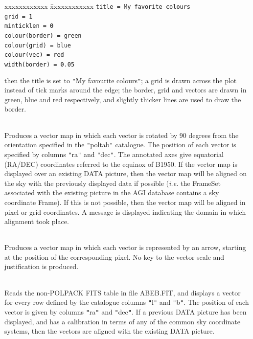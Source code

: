 \documentclass[twoside,11pt]{article}
\renewcommand{\_}{\texttt{\symbol{95}}}
\newlength{\sstexampleslength}
\newcommand{\sstexamplesubsection}[2]{\sloppy
\item[\parbox{\sstexampleslength}{\ssttt #1}] \mbox{} \vspace{1.0ex}
\\ #2 }
\newcommand{\sstnotes}[1]{\item[Notes:] \mbox{} \\[1.3ex] #1}
\newcommand{\sstitemlist}[1]{
  \mbox{} \\
  \vspace{-3.5ex}
  \begin{itemize}
     #1
  \end{itemize}
}
\newcommand{\sstexamplesubsection}[2]{\item[{\ssttt #1}] #2}
\newcommand{\sstnotes}[1]{\item[Notes:] #1 }
\newcommand{\sstitemlist}[1]{
      \begin{itemize}
         #1
      \end{itemize}
      \\
   }
\begin{document}
{{{\begin{tabbing}
 xxxxxxxxxxxx \= xxxxxxxxxxxx \kill
              \>  \texttt{title = My favorite colours} \\
              \>  \texttt{grid = 1} \\
              \>  \texttt{minticklen = 0} \\
              \>  \texttt{colour(border) = green} \\
              \>  \texttt{colour(grid) = blue} \\
              \>  \texttt{colour(vec) = red} \\
              \>  \texttt{width(border) = 0.05}
\end{tabbing}

         then the title is set to {\tt "}My favourite colours{\tt "}; a grid is drawn
         across the plot instead of tick marks around the edge; the border,
         grid and vectors are drawn in green, blue and red respectively,
         and slightly thicker lines are used to draw the border.
      }
      \sstexamplesubsection{
         polplot poltab ra dec noclear angrot=90 frame=eq(B1950)
      }{
         Produces a vector map in which each vector is rotated by 90
         degrees from the orientation specified in the {\tt "}poltab{\tt "}
         catalogue. The position of each vector is specified by columns
         {\tt "}ra{\tt "} and {\tt "}dec{\tt "}. The annotated axes give equatorial (RA/DEC)
         coordinates referred to the equinox of B1950. If the vector map
         is displayed over an existing DATA picture, then the vector map
         will be aligned on the sky with the previously displayed data if
         possible (\emph{i.e.} the FrameSet associated with the existing picture
         in the AGI database contains a sky coordinate Frame). If this is
         not possible, then the vector map will be aligned in pixel or
         grid coordinates. A message is displayed indicating the domain
         in which alignment took place.
      }
      \sstexamplesubsection{
         polplot poltab arrow=0.01 just=start nokey
      }{
         Produces a vector map in which each vector is represented by an
         arrow, starting at the position of the corresponding pixel.  No key
         to the vector scale and justification is produced.
      }
      \sstexamplesubsection{
         polplot ABEB.FIT clear=no colx=ra coly=dec colmag=l colang=b
      }{
         Reads the non-POLPACK FITS table in file ABEB.FIT, and displays a
         vector for every row defined by the catalogue columns {\tt "}l{\tt "} and {\tt "}b{\tt "}.
         The position of each vector is given by columns {\tt "}ra{\tt "} and {\tt "}dec{\tt "}.
         If a previous DATA picture has been displayed, and has a calibration
         in terms of any of the common sky coordinate systems, then the
         vectors are aligned with the existing DATA picture.
      }
   }
   \sstnotes{
      \sstitemlist{

}}}
\end{document}
